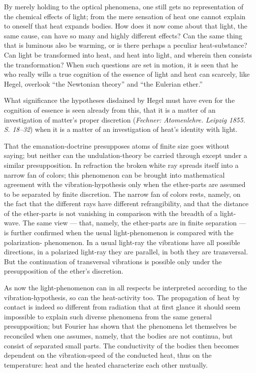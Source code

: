 \documentclass[12pt]{book}
\begin{document}
By merely holding to the optical phenomena, one still gets no representation of the
chemical effects of light; from the mere sensation of heat one cannot explain to
oneself that heat expands bodies. How does it now come about that light, the same
cause, can have so many and highly different effects? Can the same thing that is
luminous also be warming, or is there perhaps a peculiar heat-substance? Can light
be transformed into heat, and heat into light, and wherein then consists the
transformation? When such questions are set in motion, it is seen that he who
really wills a true cognition of the essence of light and heat can scarcely, like
Hegel, overlook ``the Newtonian theory'' and ``the Eulerian ether.''

What significance the hypotheses disdained by Hegel must have even for the
cognition of essence is seen already from this, that it is a matter of an
investigation of matter's proper discretion (\textit{Fechner: Atomenlehre. Leipzig
1855. S. 18--32}) when it is a matter of an investigation of heat's identity with
light.

That the emanation-doctrine presupposes atoms of finite size goes without saying;
but neither can the undulation-theory be carried through except under a similar
presupposition. In refraction the broken white ray spreads itself into a narrow
fan of colors; this phenomenon can be brought into mathematical agreement with the
vibration-hypothesis only when the ether-parts are assumed to be separated by
finite discretion. The narrow fan of colors rests, namely, on the fact that the
different rays have different refrangibility, and that the distance of the
ether-parts is not vanishing in comparison with the breadth of a light-wave. The
same view — that, namely, the ether-parts are in finite separation — is further
confirmed when the usual light-phenomenon is compared with the polarization-
phenomenon. In a usual light-ray
the vibrations have all possible directions, in a polarized light-ray they are
parallel, in both they are transversal. But the continuation of transversal
vibrations is possible only under the presupposition of the ether's discretion.

As now the light-phenomenon can in all respects be interpreted according to the
vibration-hypothesis, so can the heat-activity too. The propagation of heat by
contact is indeed so different from radiation that at first glance it should seem
impossible to explain such diverse phenomena from the same general presupposition;
but Fourier has shown that the phenomena let themselves be reconciled when one
assumes, namely, that the bodies are not continua, but consist of separated small
parts. The conductivity of the bodies then becomes dependent on the vibration-speed
of the conducted heat, thus on the temperature: heat and the heated characterize
each other mutually.
\end{document}
